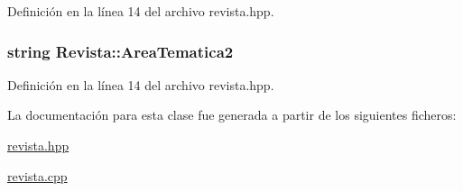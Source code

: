 Definición en la línea 14 del archivo revista.\-hpp.

\hypertarget{class_revista_a09c823de4709bc494a3373140133ad8d}{
\subsubsection[{Area\-Tematica2}]{\setlength{\rightskip}{0pt plus 5cm}string Revista\-::\-Area\-Tematica2\hspace{0.3cm}{\ttfamily [private]}}}\label{class_revista_a09c823de4709bc494a3373140133ad8d}


Definición en la línea 14 del archivo revista.\-hpp.



La documentación para esta clase fue generada a partir de los siguientes ficheros\-:\begin{DoxyCompactItemize}
\item 
\hyperlink{revista_8hpp}{revista.\-hpp}\item 
\hyperlink{revista_8cpp}{revista.\-cpp}\end{DoxyCompactItemize}
